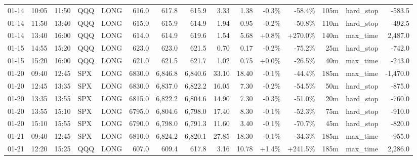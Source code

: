\documentclass[11pt,a4paper,twoside]{article}
\begin{document}
\begin{landscape}
\begin{center}
\begin{longtable}{>{\color{txtmain}}l l l l l r r r r r r r r >{\color{txtmain}}l r}
01-14 & 10:05 & 11:50 & QQQ & LONG & 616.0 & 617.8 & 615.9 & 3.33 & 1.38 & \textcolor{lossred}{-0.3\%} & \textcolor{lossred}{-58.4\%} & 105m & hard\_stop & \textcolor{lossred}{-583.5} \\
01-14 & 11:50 & 13:40 & QQQ & LONG & 615.0 & 615.9 & 614.9 & 1.94 & 0.95 & \textcolor{lossred}{-0.2\%} & \textcolor{lossred}{-50.8\%} & 110m & hard\_stop & \textcolor{lossred}{-492.5} \\
01-14 & 13:40 & 16:00 & QQQ & LONG & 614.0 & 614.9 & 619.6 & 1.54 & 5.68 & \textcolor{wingreen}{+0.8\%} & \textcolor{wingreen}{+270.0\%} & 140m & max\_time & \textcolor{wingreen}{2,487.0} \\
01-15 & 14:55 & 15:20 & QQQ & LONG & 623.0 & 623.0 & 621.5 & 0.70 & 0.17 & \textcolor{lossred}{-0.2\%} & \textcolor{lossred}{-75.2\%} & 25m & hard\_stop & \textcolor{lossred}{-742.0} \\
01-15 & 15:20 & 16:00 & QQQ & LONG & 621.0 & 621.5 & 621.7 & 1.02 & 0.75 & \textcolor{wingreen}{+0.0\%} & \textcolor{lossred}{-26.5\%} & 40m & max\_time & \textcolor{lossred}{-243.0} \\
01-20 & 09:40 & 12:45 & SPX & LONG & 6830.0 & 6,846.8 & 6,840.6 & 33.10 & 18.40 & \textcolor{lossred}{-0.1\%} & \textcolor{lossred}{-44.4\%} & 185m & max\_time & \textcolor{lossred}{-1,470.0} \\
01-20 & 12:45 & 13:35 & SPX & LONG & 6830.0 & 6,837.0 & 6,822.2 & 16.05 & 7.30 & \textcolor{lossred}{-0.2\%} & \textcolor{lossred}{-54.5\%} & 50m & hard\_stop & \textcolor{lossred}{-875.0} \\
01-20 & 13:35 & 13:55 & SPX & LONG & 6815.0 & 6,822.2 & 6,804.6 & 14.90 & 7.30 & \textcolor{lossred}{-0.3\%} & \textcolor{lossred}{-51.0\%} & 20m & hard\_stop & \textcolor{lossred}{-760.0} \\
01-20 & 13:55 & 15:10 & SPX & LONG & 6795.0 & 6,804.6 & 6,798.0 & 17.40 & 8.30 & \textcolor{lossred}{-0.1\%} & \textcolor{lossred}{-52.3\%} & 75m & hard\_stop & \textcolor{lossred}{-910.0} \\
01-20 & 15:10 & 15:55 & SPX & LONG & 6790.0 & 6,798.0 & 6,791.3 & 11.60 & 3.40 & \textcolor{lossred}{-0.1\%} & \textcolor{lossred}{-70.7\%} & 45m & hard\_stop & \textcolor{lossred}{-820.0} \\
01-21 & 09:40 & 12:45 & SPX & LONG & 6810.0 & 6,824.2 & 6,820.1 & 27.85 & 18.30 & \textcolor{lossred}{-0.1\%} & \textcolor{lossred}{-34.3\%} & 185m & max\_time & \textcolor{lossred}{-955.0} \\
01-21 & 12:20 & 15:25 & QQQ & LONG & 607.0 & 609.4 & 617.8 & 3.16 & 10.78 & \textcolor{wingreen}{+1.4\%} & \textcolor{wingreen}{+241.5\%} & 185m & max\_time & \textcolor{wingreen}{2,286.0} \\

\end{longtable}
\end{center}
\end{landscape}
\end{document}
